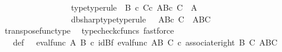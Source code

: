 \begin{isabellebody}
\ \ \ \ \ \ \ \ \ \ \ \ \ \ \ \ \ {\isasymphi}{\isacharunderscore}{\kern0pt}type{\isacharbrackleft}{\kern0pt}type{\isacharunderscore}{\kern0pt}rule{\isacharbrackright}{\kern0pt}{\isacharcolon}{\kern0pt}\ {\isachardoublequoteopen}{\isasymphi}{\isacharcolon}{\kern0pt}\ B\ {\isasymtimes}\isactrlsub c\ {\isacharparenleft}{\kern0pt}C{\isasymtimes}\isactrlsub c\ {\isacharparenleft}{\kern0pt}A\isactrlbsup {\isacharparenleft}{\kern0pt}B{\isasymtimes}\isactrlsub c\ C{\isacharparenright}{\kern0pt}\isactrlesup {\isacharparenright}{\kern0pt}{\isacharparenright}{\kern0pt}\ {\isasymrightarrow}\ A{\isachardoublequoteclose}\ \ \isanewline
\ \ \ \ \ \ \ \ \ \ \ \ \ \ \ \ \ {\isasymphi}dbsharp{\isacharunderscore}{\kern0pt}type{\isacharbrackleft}{\kern0pt}type{\isacharunderscore}{\kern0pt}rule{\isacharbrackright}{\kern0pt}{\isacharcolon}{\kern0pt}\ {\isachardoublequoteopen}{\isacharparenleft}{\kern0pt}{\isasymphi}\isactrlsup {\isasymsharp}{\isacharparenright}{\kern0pt}\isactrlsup {\isasymsharp}\ {\isacharcolon}{\kern0pt}\ {\isacharparenleft}{\kern0pt}A\isactrlbsup {\isacharparenleft}{\kern0pt}B{\isasymtimes}\isactrlsub c\ C{\isacharparenright}{\kern0pt}\isactrlesup {\isacharparenright}{\kern0pt}\ {\isasymrightarrow}\ {\isacharparenleft}{\kern0pt}{\isacharparenleft}{\kern0pt}A\isactrlbsup B\isactrlesup {\isacharparenright}{\kern0pt}\isactrlbsup C\isactrlesup {\isacharparenright}{\kern0pt}{\isachardoublequoteclose}\isanewline
\ \ \ \ \isamarkupfalse%
\ transpose{\isacharunderscore}{\kern0pt}func{\isacharunderscore}{\kern0pt}type\ \isamarkupfalse%
\ {\isacharparenleft}{\kern0pt}typecheck{\isacharunderscore}{\kern0pt}cfuncs{\isacharcomma}{\kern0pt}\ fastforce{\isacharparenright}{\kern0pt}\isanewline
\isanewline
\ \ \isamarkupfalse%
\ {\isasympsi}\ \ {\isasympsi}{\isacharunderscore}{\kern0pt}def{\isacharcolon}{\kern0pt}\ {\isachardoublequoteopen}{\isasympsi}\ {\isacharequal}{\kern0pt}\ {\isacharparenleft}{\kern0pt}eval{\isacharunderscore}{\kern0pt}func\ A\ B{\isacharparenright}{\kern0pt}\ {\isasymcirc}\isactrlsub c\ {\isacharparenleft}{\kern0pt}id{\isacharparenleft}{\kern0pt}B{\isacharparenright}{\kern0pt}{\isasymtimes}\isactrlsub f\ eval{\isacharunderscore}{\kern0pt}func\ {\isacharparenleft}{\kern0pt}A\isactrlbsup B\isactrlesup {\isacharparenright}{\kern0pt}\ C{\isacharparenright}{\kern0pt}\ {\isasymcirc}\isactrlsub c\ {\isacharparenleft}{\kern0pt}associate{\isacharunderscore}{\kern0pt}right\ B\ C\ {\isacharparenleft}{\kern0pt}{\isacharparenleft}{\kern0pt}A\isactrlbsup B\isactrlesup {\isacharparenright}{\kern0pt}\isactrlbsup C\isactrlesup {\isacharparenright}{\kern0pt}{\isacharparenright}{\kern0pt}{\isachardoublequoteclose}\ \isanewline

\end{isabellebody}
